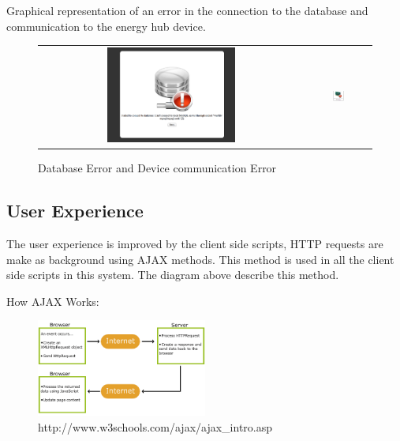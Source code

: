 %

Graphical representation of an error in the connection to the database and communication to the energy hub device.
\begin{figure}[H]
	\begin{tabular}{ c c }
		\includegraphics[width=0.5\textwidth]{images/error_db.png}
&
		\includegraphics[width=0.2\textwidth]{images/error_device.png}
\end{tabular}
\caption{Database Error and Device communication Error}
\end{figure} 

\subsection{User Experience}
The user experience is improved by the client side scripts, HTTP requests are make as background using AJAX methods. This method is used in all the client side scripts in this system. The diagram above describe this method.

How AJAX Works:

\begin{figure}[H]
	\begin{centering}
		\includegraphics[width=0.5\textwidth]{images/ajax.png}
		\caption{http://www.w3schools.com/ajax/ajax\_intro.asp}
	\end{centering}
\end{figure}

